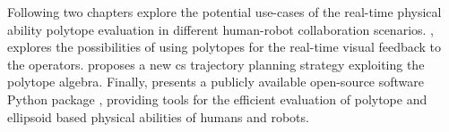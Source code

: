 Following two chapters explore the potential use-cases of the real-time physical ability polytope evaluation in different human-robot collaboration scenarios. , explores the possibilities of using polytopes for the real-time visual feedback to the operators.  proposes a new \gls{cs} trajectory planning strategy exploiting the polytope algebra. 
Finally,  presents a publicly available open-source software Python package , providing tools for the efficient evaluation of polytope and ellipsoid based physical abilities of humans and robots.

